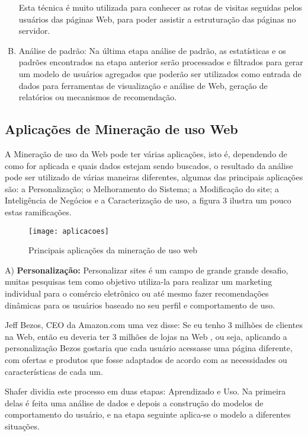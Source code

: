 \begin{enumerate}[A)]
    Esta técnica é muito utilizada para conhecer as rotas de visitas seguidas pelos usuários das páginas Web, para poder assistir a estruturação das páginas no servidor.

\item Análise de padrão:
	Na última etapa análise de padrão, as estatísticas e os padrões encontrados na etapa anterior serão processados e filtrados para gerar um modelo de usuários agregados que poderão ser utilizados como entrada de dados para ferramentas de visualização e análise de Web, geração de relatórios ou mecanismos de recomendação.

\end{enumerate}

\subsection{Aplicações de Mineração de uso Web}
    A Mineração de uso da Web pode ter várias aplicações, isto é, dependendo de como for aplicada e quais dados estejam sendo buscados, o resultado da análise pode ser utilizado de várias maneiras diferentes, algumas das principais aplicações são: a Personalização; o Melhoramento do Sistema; a Modificação do site; a Inteligência de Negócios e a Caracterização de uso, a figura 3 ilustra um pouco estas ramificações.

\begin{figure}[!htb]
\centering
\texttt{[image: aplicacoes]}
\caption{Principais aplicações da mineração de uso web}
\label{Rotulo}
\end{figure}

A) \textbf{Personalização:}
    Personalizar sites é um campo de grande grande desafio, muitas pesquisas tem como objetivo utiliza-la para realizar um marketing individual para o comércio eletrônico ou até mesmo fazer recomendações dinâmicas para os usuários baseado no seu perfil e comportamento de uso.

    Jeff Bezos, CEO da Amazon.com uma vez disse: Se eu tenho 3 milhões de clientes na Web, então eu deveria ter 3 milhões de lojas na Web \cite{Schafer}, ou seja, aplicando a personalização Bezos gostaria que cada usuário acessasse uma página diferente, com ofertas e produtos que fosse adaptados de acordo com as necessidades ou características de cada um.

    Shafer\cite{Schafer} dividia este processo em duas etapas: Aprendizado e Uso. Na primeira delas é feita uma análise de dados e depois a construção do modelos de comportamento do usuário, e na etapa seguinte aplica-se o modelo a diferentes situações.

